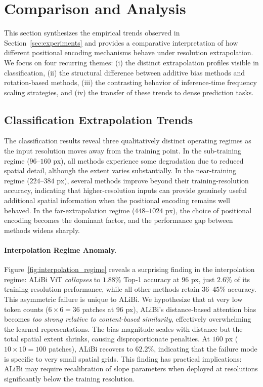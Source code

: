\section{Comparison and Analysis}
\label{sec:analysis}

This section synthesizes the empirical trends observed in Section~\ref{sec:experiments} and
provides a comparative interpretation of how different positional encoding mechanisms behave under
resolution extrapolation. We focus on four recurring themes: (i) the distinct extrapolation
profiles visible in classification, (ii) the structural difference between additive bias methods
and rotation-based methods, (iii) the contrasting behavior of inference-time frequency scaling
strategies, and (iv) the transfer of these trends to dense prediction tasks.

\subsection{Classification Extrapolation Trends}

The classification results reveal three qualitatively distinct operating regimes as the input
resolution moves away from the training point. In the sub-training regime ($96$--$160$ px), all
methods experience some degradation due to reduced spatial detail, although the extent varies
substantially. In the near-training regime ($224$--$384$ px), several methods improve beyond their
training-resolution accuracy, indicating that higher-resolution inputs can provide genuinely useful
additional spatial information when the positional encoding remains well behaved. In the
far-extrapolation regime ($448$--$1024$ px), the choice of positional encoding becomes the dominant
factor, and the performance gap between methods widens sharply.

\paragraph{Interpolation Regime Anomaly.}
Figure~\ref{fig:interpolation_regime} reveals a surprising finding in the interpolation regime:
ALiBi ViT \emph{collapses} to $1.88\%$ Top-1 accuracy at $96$ px, just $2.6\%$ of its training-resolution
performance, while all other methods retain $36$--$45\%$ accuracy. This asymmetric failure is unique
to ALiBi. We hypothesize that at very low token counts ($6 \times 6 = 36$ patches at $96$ px), ALiBi's
distance-based attention bias becomes \emph{too strong relative to content-based similarity},
effectively overwhelming the learned representations. The bias magnitude scales with distance but
the total spatial extent shrinks, causing disproportionate penalties. At $160$ px ($10 \times 10 = 100$ patches),
ALiBi recovers to $62.2\%$, indicating that the failure mode is specific to very small spatial grids.
This finding has practical implications: ALiBi may require recalibration of slope parameters when deployed at resolutions significantly below the training resolution.

